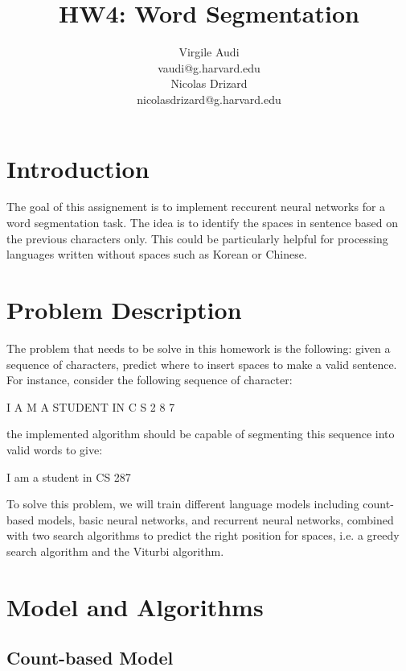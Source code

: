 \documentclass[11pt]{article}
\title{HW4: Word Segmentation}
\author{Virgile Audi \\ vaudi@g.harvard.edu \\ Nicolas Drizard \\ nicolasdrizard@g.harvard.edu}
\begin{document}
\maketitle{}
\section{Introduction}

The goal of this assignement is to implement reccurent neural networks for a word segmentation task. The idea is to identify the spaces in sentence based on the previous characters only. This could be particularly helpful for processing languages written without spaces such as Korean or Chinese.


\section{Problem Description}

The problem that needs to be solve in this homework is the following: given a sequence of characters, predict where to insert spaces to make a valid sentence. For instance, consider the following sequence of character:
\begin{center}
I A M A STUDENT IN C S 2 8 7\\
\end{center}
the implemented algorithm should be capable of segmenting this sequence into valid words to give:
\begin{center}
I am a student in CS 287\\
\end{center}

\noindent To solve this problem, we will train different language models including count-based models, basic neural networks, and recurrent neural networks, combined with two search algorithms to predict the right position for spaces, i.e. a greedy search algorithm and the Viturbi algorithm. 



\section{Model and Algorithms}

\subsection{Count-based Model}
\end{document}
